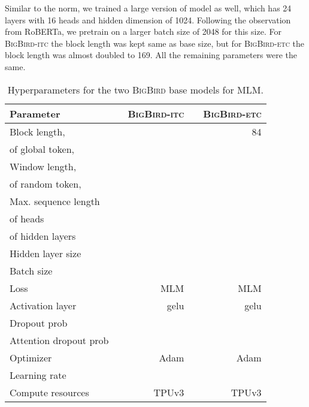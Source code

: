 \documentclass{article}
\newcommand{\bigb}{\textsc{BigBird}\xspace}
\begin{document}
Similar to the norm, we trained a large version of model as well, which has 24 layers with 16 heads and hidden dimension of 1024.
Following the observation from RoBERTa, we pretrain on a larger batch size of 2048 for this size.
For \bigb-\textsc{itc} the block length was kept same as base size, but for \bigb-\textsc{etc} the block length was almost doubled to 169. All the remaining parameters were the same.


\begin{table}[bht]
\small
\centering
\begin{tabular}{@{}l c r c r @{}}
\toprule
Parameter & & \bigb-\textsc{itc} & & \bigb-\textsc{etc} \\
\midrule
 Block length,  & &  & & 84\\
  of global token,  & &  & &  \\
 Window length,   & &  & &  \\
  of random token,  & &  & &  \\
 Max. sequence length & &  & & \\
  of heads & &  & & \\
  of hidden layers & &  & &  \\
 Hidden layer size & &  & &  \\
 Batch size & &  & &  \\
 Loss & & MLM & & MLM \\
 Activation layer & & gelu & & gelu \\ 
 Dropout prob & &  & &  \\
 Attention dropout prob & &  & &  \\
 Optimizer & & Adam & & Adam\\
 Learning rate & &   & & \\
 Compute resources & &  TPUv3 & &  TPUv3\\
\bottomrule
\end{tabular}
\vspace{2mm}
\caption{Hyperparameters for the two \bigb base models for MLM.}
\label{tab:app_mlm_param}
\end{table}
\end{document}
